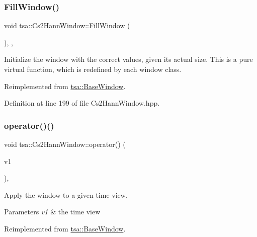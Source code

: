 \subsubsection{\texorpdfstring{Fill\+Window()}{FillWindow()}}
{\footnotesize\ttfamily void tsa\+::\+Cs2\+Hann\+Window\+::\+Fill\+Window (\begin{DoxyParamCaption}{ }\end{DoxyParamCaption})\hspace{0.3cm}{\ttfamily [inline]}, {\ttfamily [private]}, {\ttfamily [virtual]}}

Initialize the window with the correct values, given its actual size. This is a pure virtual function, which is redefined by each window class. 

Reimplemented from \hyperlink{classtsa_1_1_base_window_aa74b29105d94caa521d308198e8e6643}{tsa\+::\+Base\+Window}.



Definition at line 199 of file Cs2\+Hann\+Window.\+hpp.

\mbox{\label{classtsa_1_1_cs2_hann_window_af896b6c2dc55a283b67c2b694926918a}} 
\subsubsection{\texorpdfstring{operator()()}{operator()()}\hspace{0.1cm}{\footnotesize\ttfamily [1/2]}}
{\footnotesize\ttfamily void tsa\+::\+Cs2\+Hann\+Window\+::operator() (\begin{DoxyParamCaption}\item[{\hyperlink{namespacetsa_ac599574bcc094eda25613724b8f3ca9e}{Seq\+View\+Double} \&}]{v1 }\end{DoxyParamCaption})\hspace{0.3cm}{\ttfamily [inline]}, {\ttfamily [virtual]}}

Apply the window to a given time view.


\begin{DoxyParams}{Parameters}
{\em v1} & the time view \\
\hline
\end{DoxyParams}


Reimplemented from \hyperlink{classtsa_1_1_base_window_a05d9edb95dc01840a1b2df78dfa3a8c1}{tsa\+::\+Base\+Window}.



